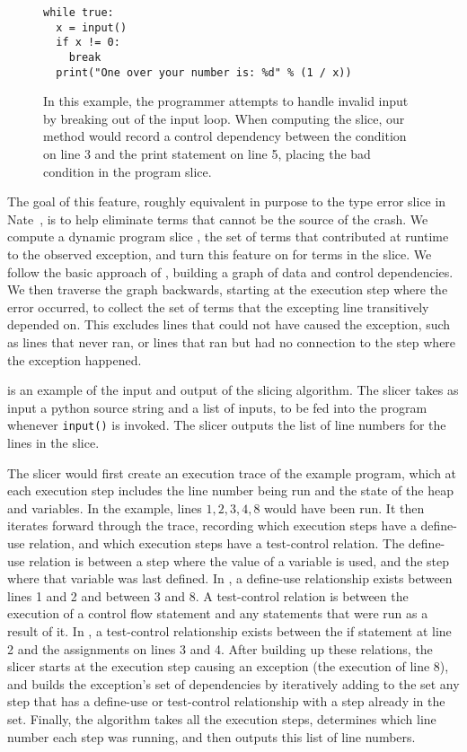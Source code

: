 \documentclass[conference]{IEEEtran}
\newcommand\lt[1]{{\lstinline|#1|}}
\begin{document}
\begin{figure}
\begin{lstlisting}
while true:
  x = input()
  if x != 0:
    break
  print("One over your number is: %d" % (1 / x))
\end{lstlisting}
\caption{
  In this example, the programmer attempts to handle invalid input by
  breaking out of the input loop. When computing the slice, our method
  would record a control dependency between the condition on line 3 and the
  print statement on line 5, placing the bad condition in the program
  slice.
}
\label{fig-early-break}
\end{figure}

The goal of this feature, roughly equivalent in purpose to the type error
slice in Nate~\cite{learning-to-blame}, is to help eliminate terms that
cannot be the source of the crash. We compute a dynamic program slice
\cite{KOREL1988155}, the set of terms that contributed at runtime to the
observed exception, and turn this feature on for terms in the slice. We
follow the basic approach of \cite{KOREL1988155, KOREL1990187}, building a
graph of data and control dependencies. We then traverse the graph
backwards, starting at the execution step where the error occurred, to
collect the set of terms that the excepting line transitively depended on.
This excludes lines that could not have caused the exception, such as lines
that never ran, or lines that ran but had no connection to the step where
the exception happened.

 is an example of the input and output of the slicing
algorithm. The slicer takes as input a python source string and a list of inputs,
to be fed into the program whenever \lt{input()} is invoked. The slicer outputs
the list of line numbers for the lines in the slice.

The slicer would first create an execution trace of the example program, which
at each execution step includes the line number being run and the state of the
heap and variables. In the example, lines $1, 2, 3, 4, 8$ would have been run.
It then iterates forward through the trace, recording which
execution steps have a define-use relation, and which execution steps
have a test-control relation. The define-use relation is between a step where
the value of a variable is used, and the step where that variable was last
defined. In , a define-use relationship exists
between lines 1 and 2 and between 3 and 8. A test-control relation is between
the execution of a control flow statement and any statements that were run as
a result of it. In , a test-control relationship exists
between the if statement at line 2 and the assignments on lines 3 and 4. After
building up these relations, the slicer starts at the execution step causing an
exception (the execution of line 8), and builds the exception's set of
dependencies by iteratively adding to the set any step that has a define-use
or test-control relationship with a step already in the set. Finally, the
algorithm takes all the execution steps, determines which line number each step
was running, and then outputs this list of line numbers.
\end{document}
